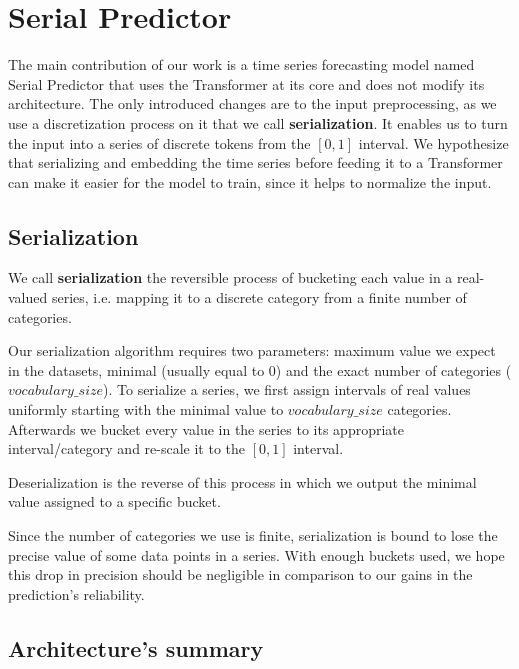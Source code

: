 \documentclass[en]{pracamgr}
\begin{document}
\section{Serial Predictor}
The main contribution of our work is a time series forecasting model named Serial Predictor that uses the Transformer at its core and does not modify its architecture. The only introduced changes are to the input preprocessing, as we use a discretization process on it that we call \textbf{serialization}. It enables us to turn the input into a series of discrete tokens from the $[0, 1]$ interval. We hypothesize that serializing and embedding the time series before feeding it to a Transformer can make it easier for the model to train, since it helps to normalize the input.


\subsection{Serialization}


We call \textbf{serialization} the reversible process of bucketing each value in a real-valued series, i.e. mapping it to a discrete category from a finite number of categories.

Our serialization algorithm requires two parameters: maximum value we expect in the datasets, minimal (usually equal to 0) and the exact number of categories ($vocabulary\_size$).
To serialize a series, we first assign intervals of real values uniformly starting with the minimal value to $vocabulary\_size$ categories.
Afterwards we bucket every value in the series to its appropriate interval/category and re-scale it to the $[0, 1]$ interval.

Deserialization is the reverse of this process in which we output the minimal value assigned to a specific bucket. 

Since the number of categories we use is finite, serialization is bound to lose the precise value of some data points in a series. With enough buckets used, we hope this drop in precision should be negligible in comparison to our gains in the prediction's reliability. %

\subsection{Architecture's summary}
\end{document}
